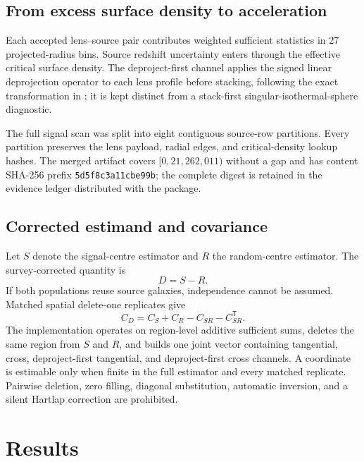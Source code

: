 \documentclass[11pt]{article}
\begin{document}
\subsection{From excess surface density to acceleration}

Each accepted lens--source pair contributes weighted sufficient statistics in
27 projected-radius bins. Source redshift uncertainty enters through the
effective critical surface density. The deproject-first channel applies the
signed linear deprojection operator to each lens profile before stacking,
following the exact transformation in \citet{Mistele2024}; it is kept distinct
from a stack-first singular-isothermal-sphere diagnostic.

The full signal scan was split into eight contiguous source-row partitions.
Every partition preserves the lens payload, radial edges, and critical-density
lookup hashes. The merged artifact covers $[0,21{,}262{,}011)$ without a gap
and has content SHA-256 prefix \texttt{5d5f8c3a11cbe99b}; the complete
digest is retained in the evidence ledger distributed with the package.

\subsection{Corrected estimand and covariance}

Let $S$ denote the signal-centre estimator and $R$ the random-centre estimator.
The survey-corrected quantity is
\begin{equation}
D=S-R.
\end{equation}
If both populations reuse source galaxies, independence cannot be assumed.
Matched spatial delete-one replicates give
\begin{equation}
C_D=C_S+C_R-C_{SR}-C_{SR}^{\mathsf T}.
\label{eq:pairedcov}
\end{equation}
The implementation operates on region-level additive sufficient sums, deletes
the same region from $S$ and $R$, and builds one joint vector containing
tangential, cross, deproject-first tangential, and deproject-first cross
channels. A coordinate is estimable only when finite in the full estimator and
every matched replicate. Pairwise deletion, zero filling, diagonal
substitution, automatic inversion, and a silent Hartlap correction
\citep{Hartlap2007} are prohibited.

\section{Results}
\end{document}
